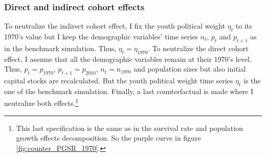 \subsubsection{Direct and indirect cohort effects}

To neutralize the indirect cohort effect, I fix the youth political weight $\eta_t$ to its 1970's value but I keep the demographic variables' time series $n_t$, $p_t$ and $p_{t+1}$ as in the benchmark simulation. Thus, $\eta_t = \eta_{1970}$. To neutralize the direct cohort effect, I assume that all the demographic variables remain at their 1970's level. Thus, $p_t = p_{1970}$, $p_{t+1} = p_{2010}$, $n_t = n_{1970}$ and population sizes but also initial capital stocks are recalculated. But the youth political weight time series $\eta_t$ is the one of the benchmark simulation. Finally, a last counterfactual is made where I neutralize both effects.\footnote{This last specification is the same as in the survival rate and population growth effects decomposition. So the purple curve in figure \ref{fig:counter_PGSR_1970}.}


